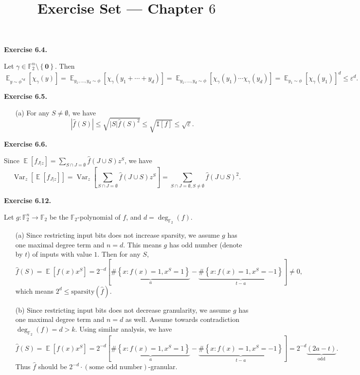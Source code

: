 \documentclass[a4paper]{article}
\title{Exercise Set --- Chapter $6$}
\date{}
\newenvironment{exercise}[1]{
	\par
	\noindent\textbf{Exercise #1.}\quad
}{
	\par
	\bigskip
}
\DeclareMathOperator*{\E}{\mathbb E}
\DeclareMathOperator{\Var}{\mathrm{Var}}
\newcommand{\eps}{\varepsilon}
\newcommand{\abs}[1]{{\left| #1 \right|}}
\newcommand{\cbra}[1]{{\left\{ #1 \right\}}}
\newcommand{\sbra}[1]{{\left[ #1 \right]}}
\newcommand{\Fbb}{\mathbb{F}}
\newcommand{\Itt}{\mathtt{I}}
\begin{document}
\maketitle

\begin{exercise}{6.4}
    Let $\gamma\in\Fbb_2^n\setminus\cbra{\bm 0}$. Then
    $$
    \E_{y\sim\phi^{*d}}\sbra{\chi_\gamma(y)}
    =\E_{y_1,\ldots,y_d\sim\phi}\sbra{\chi_\gamma(y_1+\cdots+y_d)}
    =\E_{y_1,\ldots,y_d\sim\phi}\sbra{\chi_\gamma(y_1)\cdots\chi_\gamma(y_d)}
    =\E_{y_1\sim\phi}\sbra{\chi_\gamma(y_1)}^d
    \leq\eps^d.
    $$
\end{exercise}

\begin{exercise}{6.5}
    \begin{itemize}
        \item[(a)] For any $S\neq\emptyset$, we have
            $$
            \abs{\hat f(S)}\leq\sqrt{|S|\hat f(S)^2}\leq\sqrt{\Itt[f]}\leq\sqrt\eps.
            $$
    \end{itemize}
\end{exercise}

\begin{exercise}{6.6}
    Since $\E[f_{J|z}]=\sum_{S\cap J=\emptyset}\hat f(J\cup S)z^S$, we have
    $$
    \Var_z[\E[f_{J|z}]]=\Var_z\sbra{\sum_{S\cap J=\emptyset}\hat f(J\cup S)z^S}=\sum_{S\cap J=\emptyset,S\neq\emptyset}\hat f(J\cup S)^2.
    $$
\end{exercise}

\begin{exercise}{6.12}
    Let $g:\Fbb_2^n\to\Fbb_2$ be the $\Fbb_2$-polynomial of $f$, and $d=\deg_{\Fbb_2}(f)$.
    \begin{itemize}
        \item[(a)] Since restricting input bits does not increase sparsity, we assume $g$ has one maximal degree term and $n=d$.
            This means $g$ has odd number (denote by $t$) of inputs with value $1$. Then for any $S$,
            $$
            \hat f(S)=\E\sbra{f(x)x^S}=2^{-d}\sbra{\underbrace{\#\cbra{x:f(x)=1,x^S=1}}_a-\underbrace{\#\cbra{x:f(x)=1,x^S=-1}}_{t-a}}\neq0,
            $$
            which means $2^d\leq\text{sparsity}(\hat f)$.
        \item[(b)] Since restricting input bits does not decrease granularity, we assume $g$ has one maximal degree term and $n=d$ as well. Assume towards contradiction $\deg_{\Fbb_2}(f)=d>k$. Using similar analysis, we have
            $$
            \hat f(S)=\E\sbra{f(x)x^S}=2^{-d}\sbra{\underbrace{\#\cbra{x:f(x)=1,x^S=1}}_a-\underbrace{\#\cbra{x:f(x)=1,x^S=-1}}_{t-a}}=2^{-d}\underbrace{(2a-t)}_\text{odd}.
            $$
            Thus $\hat f$ should be $2^{-d}\cdot(\text{some odd number})$-granular. 
    \end{itemize}
\end{exercise}
\end{document}
